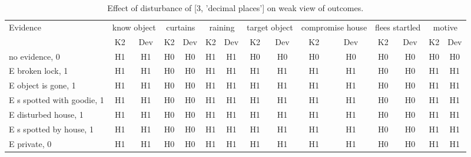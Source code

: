 \begin{table}\begin{tabular}{l|cc|cc|cc|cc|cc|cc|cc}\toprule\multirow{2}{*}{Evidence} & \multicolumn{2}{c}{know object}& \multicolumn{2}{c}{curtains}& \multicolumn{2}{c}{raining}& \multicolumn{2}{c}{target object}& \multicolumn{2}{c}{compromise house}& \multicolumn{2}{c}{flees startled}& \multicolumn{2}{c}{motive}\\& {K2} & {Dev}& {K2} & {Dev}& {K2} & {Dev}& {K2} & {Dev}& {K2} & {Dev}& {K2} & {Dev}& {K2} & {Dev}\\\midrule
no evidence, 0 & H1&H1&H0&H0&H1&H1&H0&H0&H0&H0&H0&H0&H0&H0\\E broken lock, 1 & H1&H1&H0&H0&H1&H1&H1&H1&H1&H1&H0&H0&H1&H1\\E object is gone, 1 & H1&H1&H0&H0&H1&H1&H1&H1&H1&H1&H0&H0&H1&H1\\E s spotted with goodie, 1 & H1&H1&H0&H0&H1&H1&H1&H1&H1&H1&H0&H0&H1&H1\\E disturbed house, 1 & H1&H1&H0&H0&H1&H1&H1&H1&H1&H1&H0&H0&H1&H1\\E s spotted by house, 1 & H1&H1&H0&H0&H1&H1&H1&H1&H1&H1&H0&H0&H1&H1\\E private, 0 & H1&H1&H0&H0&H1&H1&H1&H1&H1&H1&H0&H0&H1&H1\\\bottomrule\end{tabular}\caption{Effect of disturbance of [3, 'decimal places'] on weak view of outcomes.}\end{table}